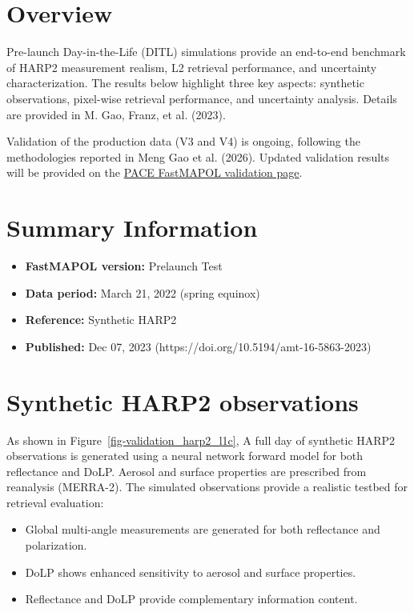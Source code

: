 \documentclass[
  11pt,
  letterpaper,
  DIV=11,
  numbers=noendperiod]{scrreprt}
\providecommand{\tightlist}{%
  \setlength{\itemsep}{0pt}\setlength{\parskip}{0pt}}
\begin{document}
\section{Overview}\label{overview-1}

Pre-launch Day-in-the-Life (DITL) simulations provide an end-to-end
benchmark of HARP2 measurement realism, L2 retrieval performance, and
uncertainty characterization. The results below highlight three key
aspects: synthetic observations, pixel-wise retrieval performance, and
uncertainty analysis. Details are provided in M. Gao, Franz, et al.
(2023).

Validation of the production data (V3 and V4) is ongoing, following the
methodologies reported in Meng Gao et al. (2026). Updated validation
results will be provided on the
\href{https://pace.oceansciences.org/pace_fastmapol.htm}{PACE FastMAPOL
validation page}.

\section{Summary Information}\label{summary-information-1}

\begin{itemize}
\tightlist
\item
  \textbf{FastMAPOL version:} Prelaunch Test\\
\item
  \textbf{Data period:} March 21, 2022 (spring equinox)\\
\item
  \textbf{Reference:} Synthetic HARP2\\
\item
  \textbf{Published:} Dec 07, 2023
  (https://doi.org/10.5194/amt-16-5863-2023)
\end{itemize}

\section{Synthetic HARP2
observations}\label{synthetic-harp2-observations}

As shown in Figure~\ref{fig-validation_harp2_l1c}, A full day of
synthetic HARP2 observations is generated using a neural network forward
model for both reflectance and DoLP. Aerosol and surface properties are
prescribed from reanalysis (MERRA-2). The simulated observations provide
a realistic testbed for retrieval evaluation:

\begin{itemize}
\tightlist
\item
  Global multi-angle measurements are generated for both reflectance and
  polarization.\\
\item
  DoLP shows enhanced sensitivity to aerosol and surface properties.\\
\item
  Reflectance and DoLP provide complementary information content.
\end{itemize}
\end{document}
